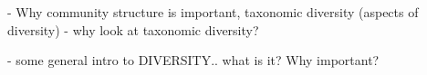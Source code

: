 \documentclass[draft]{agujournal2019}
\begin{document}
        

    - Why community structure is important, taxonomic diversity (aspects of diversity) - why look at taxonomic diversity?


    - some general intro to DIVERSITY.. what is it? Why important?
    

    

    
\end{document}
